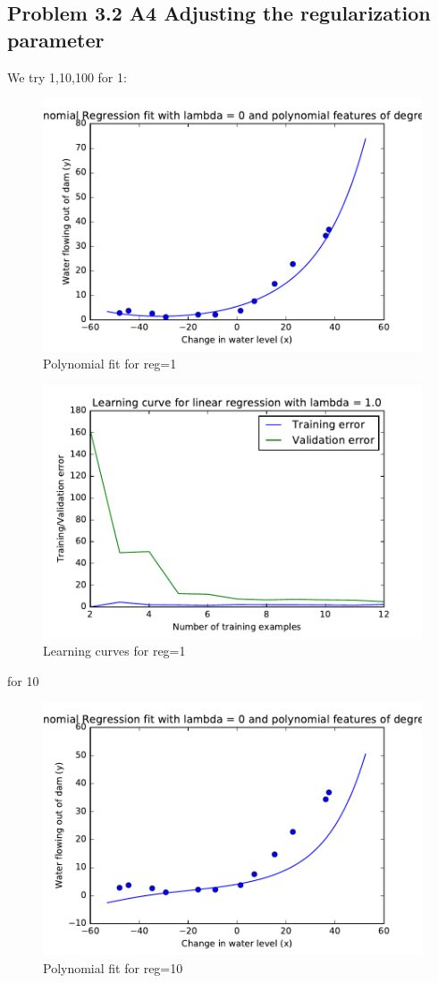 \documentclass[pdftex,11pt]{article}
\begin{document}
\subsection{Problem 3.2 A4 Adjusting the regularization parameter}
We try  1,10,100
for 1:
\begin{figure}
  \caption{Polynomial fit for reg=1}
  \centering
    \includegraphics[scale=1]{fig91.pdf}
\end{figure}
\begin{figure}
  \caption{Learning curves for reg=1}
  \centering
    \includegraphics[scale=1]{fig101.pdf}
\end{figure}
for 10
\begin{figure}
  \caption{Polynomial fit for reg=10}
  \centering
    \includegraphics[scale=1]{fig910.pdf}
\end{figure}
\end{document}
